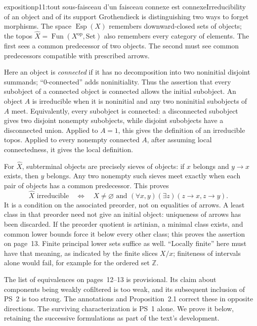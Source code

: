 \begin{dcomment}{exposition}{p11:tout sous-faisceau d'un faisceau connexe est connexe}{Irreducibility of an object and of its support}
Grothendieck is distinguishing two ways to forget morphisms. The space $\operatorname{Esp}(X)$ remembers downward-closed sets of objects; the topos $\widehat X=\operatorname{Fun}(X^{\mathrm{op}},\mathrm{Set})$ also remembers every category of elements. The first sees a common predecessor of two objects. The second must see common predecessors compatible with prescribed arrows.

Here an object is \emph{connected} if it has no decomposition into two noninitial disjoint summands; ``$0$-connected'' adds noninitiality. Thus the assertion that every subobject of a connected object is connected allows the initial subobject. An object $A$ is irreducible when it is noninitial and any two noninitial subobjects of $A$ meet. Equivalently, every subobject is connected: a disconnected subobject gives two disjoint nonempty subobjects, while disjoint subobjects have a disconnected union. Applied to $A=1$, this gives the definition of an irreducible topos. Applied to every nonempty connected $A$, after assuming local connectedness, it gives the local definition.

For $\widehat X$, subterminal objects are precisely sieves of objects: if $x$ belongs and $y\to x$ exists, then $y$ belongs. Any two nonempty such sieves meet exactly when each pair of objects has a common predecessor. This proves
\[
 \widehat X\text{ irreducible}
 \quad\Longleftrightarrow\quad
 X\ne\varnothing\text{ and }
 (\forall x,y)(\exists z)(z\to x, z\to y).
\]
It is a condition on the associated preorder, not on equalities of arrows. A least class in that preorder need not give an initial object: uniqueness of arrows has been discarded. If the preorder quotient is artinian, a minimal class exists, and common lower bounds force it below every other class; this proves the assertion on page~13. Finite principal lower sets suffice as well. ``Locally finite'' here must have that meaning, as indicated by the finite slices $X/x$; finiteness of intervals alone would fail, for example for the ordered set $\mathbb Z$.

The list of equivalences on pages~12--13 is provisional. Its claim about components being weakly cofiltered is too weak, and its subsequent inclusion of PS~2 is too strong. The annotations and Proposition~2.1 correct these in opposite directions. The surviving characterization is PS~1 alone. We prove it below, retaining the successive formulations as part of the text's development.
\end{dcomment}

